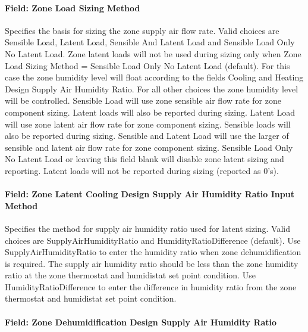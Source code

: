 \paragraph{Field: Zone Load Sizing Method}\label{field-zone-load-sizing-method}

Specifies the basis for sizing the zone supply air flow rate. Valid choices are Sensible Load, Latent Load, Sensible And Latent Load and Sensible Load Only No Latent Load.
Zone latent loads will not be used during sizing only when Zone Load Sizing Method = Sensible Load Only No Latent Load (default). For this case the zone humidity level
will float according to the fields Cooling and Heating Design Supply Air Humidity Ratio. For all other choices the zone humidity level will be controlled. Sensible Load will
use zone sensible air flow rate for zone component sizing. Latent loads will also be reported during sizing. Latent Load will use zone latent air flow rate for zone component
sizing. Sensible loads will also be reported during sizing. Sensible and Latent Load will use the larger of sensible and latent air flow rate for zone component sizing. Sensible
Load Only No Latent Load or leaving this field blank will disable zone latent sizing and reporting. Latent loads will not be reported during sizing (reported as 0's).

\paragraph{Field: Zone Latent Cooling Design Supply Air Humidity Ratio Input Method}\label{field-zone-latent-cooling-design-supply-air-humidity-ratio-input-method}

Specifies the method for supply air humidity ratio used for latent sizing. Valid choices are SupplyAirHumidityRatio and HumidityRatioDifference (default). Use
SupplyAirHumidityRatio to enter the humidity ratio when zone dehumidification is required. The supply air humidity ratio should be less than the zone humidity
ratio at the zone thermostat and humidistat set point condition. Use HumidityRatioDifference to enter the difference in humidity ratio from the zone thermostat and
humidistat set point condition.

\paragraph{Field: Zone Dehumidification Design Supply Air Humidity Ratio}\label{field-zone-dehumidification-design-supply-air-humidity-ratio}

